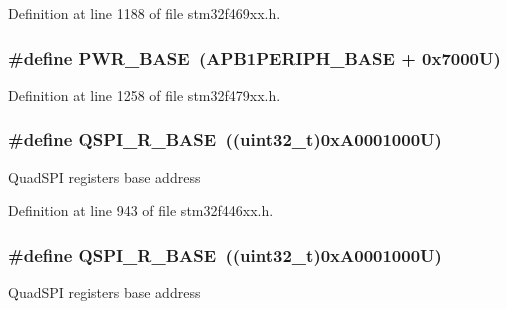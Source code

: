 Definition at line 1188 of file stm32f469xx.\+h.

\subsubsection[{\texorpdfstring{P\+W\+R\+\_\+\+B\+A\+SE}{PWR_BASE}}]{\setlength{\rightskip}{0pt plus 5cm}\#define P\+W\+R\+\_\+\+B\+A\+SE~({\bf A\+P\+B1\+P\+E\+R\+I\+P\+H\+\_\+\+B\+A\+SE} + 0x7000\+U)}\hypertarget{group___peripheral__memory__map_gac691ec23dace8b7a649a25acb110217a}{}\label{group___peripheral__memory__map_gac691ec23dace8b7a649a25acb110217a}


Definition at line 1258 of file stm32f479xx.\+h.

\subsubsection[{\texorpdfstring{Q\+S\+P\+I\+\_\+\+R\+\_\+\+B\+A\+SE}{QSPI_R_BASE}}]{\setlength{\rightskip}{0pt plus 5cm}\#define Q\+S\+P\+I\+\_\+\+R\+\_\+\+B\+A\+SE~((uint32\+\_\+t)0x\+A0001000\+U)}\hypertarget{group___peripheral__memory__map_ga3b6b7d9c67dec50557fd634505198e9d}{}\label{group___peripheral__memory__map_ga3b6b7d9c67dec50557fd634505198e9d}
Quad\+S\+PI registers base address 

Definition at line 943 of file stm32f446xx.\+h.

\subsubsection[{\texorpdfstring{Q\+S\+P\+I\+\_\+\+R\+\_\+\+B\+A\+SE}{QSPI_R_BASE}}]{\setlength{\rightskip}{0pt plus 5cm}\#define Q\+S\+P\+I\+\_\+\+R\+\_\+\+B\+A\+SE~((uint32\+\_\+t)0x\+A0001000\+U)}\hypertarget{group___peripheral__memory__map_ga3b6b7d9c67dec50557fd634505198e9d}{}\label{group___peripheral__memory__map_ga3b6b7d9c67dec50557fd634505198e9d}
Quad\+S\+PI registers base address 


